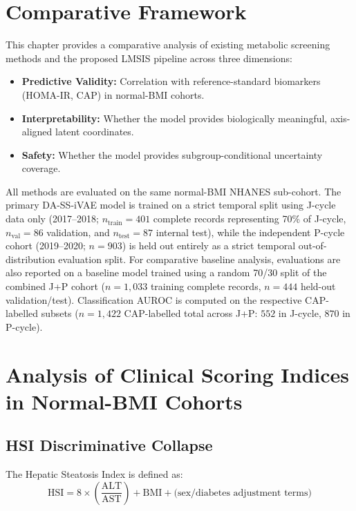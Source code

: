 \documentclass[12pt,a4paper,oneside]{report}
\newcommand{\daivae}{DA-SS-iVAE}
\begin{document}
\section{Comparative Framework}

This chapter provides a comparative analysis of existing metabolic screening methods and the proposed LMSIS pipeline across three dimensions:
\begin{itemize}[leftmargin=*]
    \item \textbf{Predictive Validity:} Correlation with reference-standard biomarkers (HOMA-IR, CAP) in normal-BMI cohorts.
    \item \textbf{Interpretability:} Whether the model provides biologically meaningful, axis-aligned latent coordinates.
    \item \textbf{Safety:} Whether the model provides subgroup-conditional uncertainty coverage.
\end{itemize}

All methods are evaluated on the same normal-BMI NHANES sub-cohort. The primary \daivae{} model is trained on a strict temporal split using J-cycle data only (2017--2018; $n_{\text{train}} = 401$ complete records representing 70\% of J-cycle, $n_{\text{val}} = 86$ validation, and $n_{\text{test}} = 87$ internal test), while the independent P-cycle cohort (2019--2020; $n = 903$) is held out entirely as a strict temporal out-of-distribution evaluation split. For comparative baseline analysis, evaluations are also reported on a baseline model trained using a random 70/30 split of the combined J+P cohort ($n = 1{,}033$ training complete records, $n = 444$ held-out validation/test). Classification AUROC is computed on the respective CAP-labelled subsets ($n = 1{,}422$ CAP-labelled total across J+P: $552$ in J-cycle, $870$ in P-cycle).

\section{Analysis of Clinical Scoring Indices in Normal-BMI Cohorts}

\subsection{HSI Discriminative Collapse}

The Hepatic Steatosis Index is defined as:
\[
\text{HSI} = 8 \times \left(\frac{\text{ALT}}{\text{AST}}\right) + \text{BMI} + \text{(sex/diabetes adjustment terms)}
\]
\end{document}
